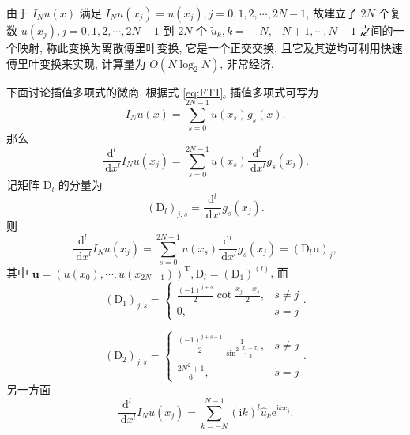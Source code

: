 由于 $I_N u(x)$ 满足 $I_N u\left(x_j\right)=u\left(x_j\right), j=0,1,2, \cdots, 2 N-1$, 故建立了 $2 N$ 个复数 $u\left(x_j\right), j=0,1,2, \cdots, 2 N-1$ 到 $2 N$ 个 $\tilde{u}_k, k=$ $-N,-N+1, \cdots, N-1$ 之间的一个映射, 
称此变换为离散傅里叶变换, 它是一个正交交换, 且它及其逆均可利用快速傅里叶变换来实现, 计算量为 $O\left(N \log _2 N\right)$, 非常经济.

下面讨论插值多项式的微商. 根据式 \eqref{eq:FT1}, 插值多项式可写为
\begin{equation}
I_N u(x)=\sum_{s=0}^{2 N-1} u\left(x_s\right) g_s(x).
\end{equation}
那么
\begin{equation}
\frac{\mathrm{d}^l}{\mathrm{~d} x^l} I_N u\left(x_j\right)=\sum_{s=0}^{2 N-1} u\left(x_s\right) \frac{\mathrm{d}^l}{\mathrm{~d} x^l} g_s\left(x_j\right).
\end{equation}
记矩阵 $\mathrm{D}_l$ 的分量为
\begin{equation}
\left(\mathrm{D}_l\right)_{j, s}=\frac{\mathrm{d}^l}{\mathrm{~d} x^l} g_s\left(x_j\right).
\end{equation}
则
\begin{equation}
\frac{\mathrm{d}^l}{\mathrm{~d} x^l} I_N u\left(x_j\right)=\sum_{s=0}^{2 N-1} u\left(x_s\right) \frac{\mathrm{d}^l}{\mathrm{~d} x^l} g_s\left(x_j\right)=\left(\mathrm{D}_l \boldsymbol{u}\right)_j,
\end{equation}
其中 $\boldsymbol{u}=\left(u\left(x_0\right), \cdots, u\left(x_{2 N-1}\right)\right)^{\mathrm{T}}, \mathrm{D}_l=\left(\mathrm{D}_1\right)^{(l)}$, 而
\begin{equation}
\left(\mathrm{D}_1\right)_{j, s}=\begin{cases}
\frac{(-1)^{j+s}}{2} \operatorname{cot} \frac{x_j-x_s}{2}, & s \neq j \\
0, & s=j
\end{cases}.
\end{equation}

\begin{equation}
    \left(\mathrm{D}_2\right)_{j, s}= \begin{cases}\frac{(-1)^{j+s+1}}{2} \frac{1}{\sin ^2 \frac{x_j-x_s}{2}}, & s \neq j \\ 
        \frac{2 N^2+1}{6}, & s=j\end{cases}.
    \end{equation}
    另一方面
    \begin{equation}
    \frac{\mathrm{d}^l}{\mathrm{~d} x^l} I_N u\left(x_j\right)=\sum_{k=-N}^{N-1}(\mathrm{i} k)^l \hat{u}_k \mathrm{e}^{\mathrm{i} k x_j}.
    \end{equation}


